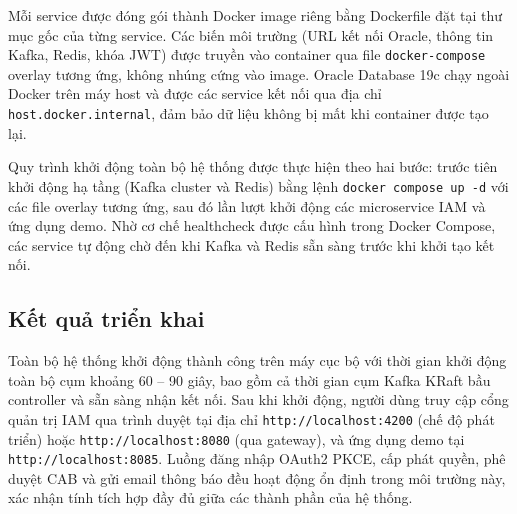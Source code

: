 \documentclass[../DoAn.tex]{subfiles}
\begin{document}
Mỗi service được đóng gói thành Docker image riêng bằng Dockerfile đặt tại thư mục gốc của từng service. Các biến môi trường (URL kết nối Oracle, thông tin Kafka, Redis, khóa JWT) được truyền vào container qua file \texttt{docker-compose} overlay tương ứng, không nhúng cứng vào image. Oracle Database 19c chạy ngoài Docker trên máy host và được các service kết nối qua địa chỉ \texttt{host.docker.internal}, đảm bảo dữ liệu không bị mất khi container được tạo lại.

Quy trình khởi động toàn bộ hệ thống được thực hiện theo hai bước: trước tiên khởi động hạ tầng (Kafka cluster và Redis) bằng lệnh \texttt{docker compose up -d} với các file overlay tương ứng, sau đó lần lượt khởi động các microservice IAM và ứng dụng demo. Nhờ cơ chế healthcheck được cấu hình trong Docker Compose, các service tự động chờ đến khi Kafka và Redis sẵn sàng trước khi khởi tạo kết nối.

\subsection{Kết quả triển khai}

Toàn bộ hệ thống khởi động thành công trên máy cục bộ với thời gian khởi động toàn bộ cụm khoảng 60 -- 90 giây, bao gồm cả thời gian cụm Kafka KRaft bầu controller và sẵn sàng nhận kết nối. Sau khi khởi động, người dùng truy cập cổng quản trị IAM qua trình duyệt tại địa chỉ \texttt{http://localhost:4200} (chế độ phát triển) hoặc \texttt{http://localhost:8080} (qua gateway), và ứng dụng demo tại \texttt{http://localhost:8085}. Luồng đăng nhập OAuth2 PKCE, cấp phát quyền, phê duyệt CAB và gửi email thông báo đều hoạt động ổn định trong môi trường này, xác nhận tính tích hợp đầy đủ giữa các thành phần của hệ thống.
\end{document}
